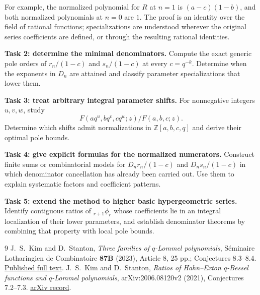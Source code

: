 \documentclass[10pt]{article}
\newcommand{\Z}{\mathbb Z}
\begin{document}
For example, the normalized polynomial for $R$ at $n=1$ is
$(a-c)(1-b)$, and both normalized polynomials at $n=0$ are $1$.
The proof is an identity over the field of rational functions;
specializations are understood wherever the original series coefficients
are defined, or through the resulting rational identities.

\medskip
\noindent\textbf{Task 2: determine the minimal denominators.}
Compute the exact generic pole orders of $r_n/(1-c)$ and $s_n/(1-c)$
at every $c=q^{-k}$. Determine when the exponents in $D_n$ are attained
and classify parameter specializations that lower them.

\medskip
\noindent\textbf{Task 3: treat arbitrary integral parameter shifts.}
For nonnegative integers $u,v,w$, study
\[
 F(aq^u,bq^v,cq^w;z)/F(a,b,c;z).
\]
Determine which shifts admit
normalizations in $\Z[a,b,c,q]$ and derive their optimal pole bounds.

\medskip
\noindent\textbf{Task 4: give explicit formulas for the normalized numerators.}
Construct finite sums or combinatorial models for
$D_nr_n/(1-c)$ and $D_ns_n/(1-c)$ in which denominator cancellation
has already been carried out. Use them to explain systematic factors
and coefficient patterns.

\medskip
\noindent\textbf{Task 5: extend the method to higher basic hypergeometric series.}
Identify contiguous ratios of \({}_{r+1}\phi_r\) whose coefficients lie
in an integral localization of their lower parameters, and establish
denominator theorems by combining that property with local pole bounds.

\begin{thebibliography}{9}
J.~S.~Kim and D.~Stanton,
\emph{Three families of $q$-Lommel polynomials},
S\'eminaire Lotharingien de Combinatoire \textbf{87B} (2023),
Article 8, 25 pp.; Conjectures 8.3--8.4.
\href{https://www.mat.univie.ac.at/~slc/wpapers/lattpath/KimStanton/KimStanton.pdf}
{Published full text}.
J.~S.~Kim and D.~Stanton,
\emph{Ratios of Hahn--Exton $q$-Bessel functions and $q$-Lommel
polynomials}, arXiv:2006.08120v2 (2021), Conjectures 7.2--7.3.
\href{https://arxiv.org/abs/2006.08120}{arXiv record}.
\end{thebibliography}
\end{document}
